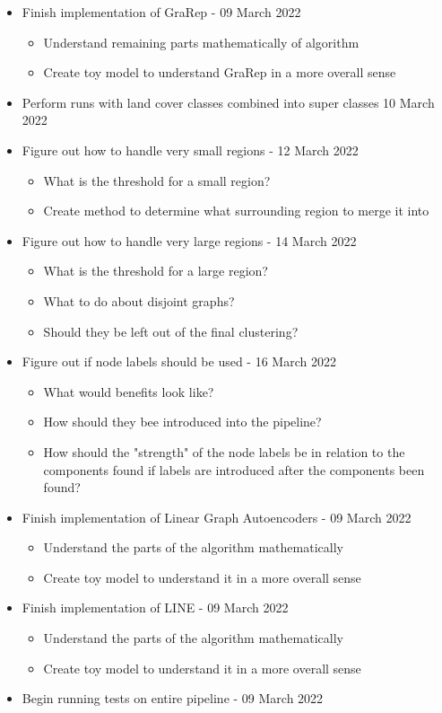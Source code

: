 \documentclass[journal,compsoc]{IEEEtran}
\begin{document}
\begin{itemize}
\item Finish implementation of GraRep - 09 March 2022
\begin{itemize}
	\item Understand remaining parts mathematically of algorithm
	\item Create toy model to understand GraRep in a more overall sense
\end{itemize}
\item Perform runs with land cover classes combined into super classes 10 March 2022

\item Figure out how to handle very small regions - 12 March 2022
\begin{itemize}
	\item What is the threshold for a small region?
	\item Create method to determine what surrounding region to merge it into
\end{itemize}

\item Figure out how to handle very large regions - 14 March 2022
\begin{itemize}
	\item What is the threshold for a large region?
	\item What to do about disjoint graphs?
	\item Should they be left out of the final clustering?
\end{itemize}

\item Figure out if node labels should be used - 16 March 2022
\begin{itemize}
	\item What would benefits look like?
	\item How should they bee introduced into the pipeline?
	\item How should the "strength" of the node labels be in relation to the components found if labels are introduced after the components been found?
\end{itemize}

\item Finish implementation of Linear Graph Autoencoders - 09 March 2022
\begin{itemize}
	\item Understand the parts of the algorithm mathematically
	\item Create toy model to understand it in a more overall sense
\end{itemize}

\item Finish implementation of LINE - 09 March 2022
\begin{itemize}
	\item Understand the parts of the algorithm mathematically
	\item Create toy model to understand it in a more overall sense
\end{itemize}

\item Begin running tests on entire pipeline  - 09 March 2022

\end{itemize}
\end{document}
